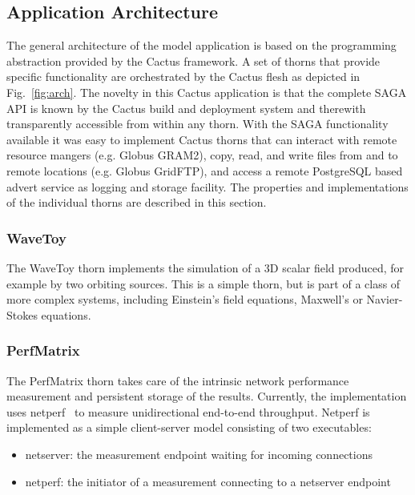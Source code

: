 \documentclass[conference,final]{IEEEtran}
\begin{document}
{%

\subsection { Application Architecture} 
The general architecture of the model application is based on the
programming abstraction provided by the Cactus framework. A set of
thorns that provide specific functionality are orchestrated by the
Cactus flesh as depicted in Fig.~\ref{fig:arch}. The novelty in this
Cactus application is that the complete SAGA API is known by the
Cactus build and deployment system and therewith transparently
accessible from within any thorn. With the SAGA functionality
available it was easy to implement Cactus thorns that can interact
with remote resource mangers (e.g. Globus GRAM2), copy, read, and
write files from and to remote locations (e.g. Globus GridFTP), and
access a remote PostgreSQL based advert service as logging and storage
facility. The properties and implementations of the individual thorns
are described in this section.

\subsubsection{WaveToy} The WaveToy thorn implements the simulation of
a 3D scalar field produced, for example by two orbiting sources.  This
is a simple thorn, but is part of a class of more complex systems,
including Einstein's field equations, Maxwell's or Navier-Stokes
equations.

\subsubsection{PerfMatrix} The PerfMatrix thorn takes care of the
intrinsic network performance measurement and persistent storage of
the results. Currently, the implementation uses
netperf~\cite{netperf_web} to measure unidirectional end-to-end
throughput. Netperf is implemented as a simple client-server model
consisting of two executables:
\begin{itemize}
\item{netserver: the measurement endpoint waiting for incoming connections}
\item{netperf: the initiator of a measurement connecting to a netserver endpoint}
\end{itemize}

}
\end{document}
